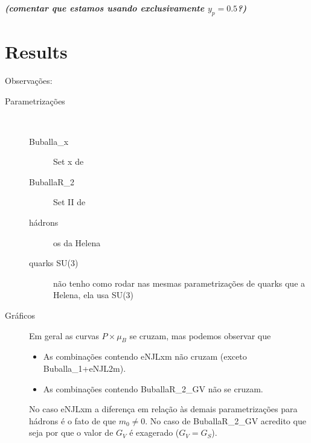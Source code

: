 \documentclass[prc, reprint, amsmath, linenumbers,10pt]{revtex4-1}
\newcommand{\comment}[1]{{\bf\textit{#1}}}
\begin{document}
\comment{(comentar que estamos usando exclusivamente $y_p = 0.5$?)}

\section{Results}

Observações:
\begin{description}
	\item[Parametrizações]~
		\begin{description}
			\item[Buballa\_x] Set x de \cite{Buballa1996}
			\item[BuballaR\_2] Set II de \cite{Buballa2005}
			\item[hádrons] os da Helena
			\item[quarks SU(3)] não tenho como rodar nas mesmas parametrizações de quarks que a Helena, ela usa SU(3)
		\end{description}
	\item[Gráficos] Em geral as curvas $P \times \mu_B$ se cruzam, mas podemos observar que
		\begin{itemize}
			\item As combinações contendo eNJLxm não cruzam (exceto Buballa\_1+eNJL2m).
			\item As combinações contendo BuballaR\_2\_GV não se cruzam.
		\end{itemize}
		No caso eNJLxm a diferença em relação às demais parametrizações para hádrons é o fato de que $m_0 \neq 0$. No caso de BuballaR\_2\_GV acredito que seja por que o valor de $G_V$ é exagerado ($G_V = G_S$). 
\end{description}
\end{document}
